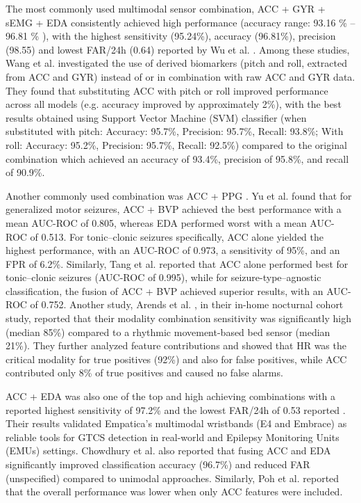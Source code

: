 The most commonly used multimodal sensor combination, ACC + GYR + sEMG + EDA \cite{Wang2025-ql,Ge2023-ab,Li2022-ty,Wu2024-yl,Wang2022-lt} consistently achieved high performance  (accuracy range: 93.16 \% \cite{Ge2023-ab} -- 96.81 \% \cite{Wu2024-yl}), with the highest sensitivity (95.24\%), accuracy (96.81\%), precision (98.55) and lowest FAR/24h (0.64) reported by Wu et al.  \cite{Wu2024-yl}. Among these studies, Wang et al. \cite{Wang2025-ql} investigated the use of derived biomarkers (pitch and roll, extracted from ACC and GYR) instead of or in combination with raw ACC and GYR data. They found that substituting ACC with pitch or roll improved performance across all models  (e.g. accuracy improved by approximately 2\%), with the best results obtained using Support Vector Machine (SVM) classifier  (when substituted with pitch: Accuracy: 95.7\%, Precision: 95.7\%, Recall: 93.8\%; With roll: Accuracy: 95.2\%, Precision: 95.7\%, Recall: 92.5\%) compared to the original combination which achieved an accuracy of 93.4\%, precision of 95.8\%, and recall of 90.9\%.

Another commonly used combination was ACC + PPG \cite{Ali2020-ke,Tang2021-td,Arends2018-ew,Yu2023-ss}. Yu et al. \cite{Yu2023-ss} found that for generalized motor seizures, ACC + BVP achieved the best performance with a mean AUC-ROC of 0.805, whereas EDA performed worst with a mean AUC-ROC of 0.513. For tonic–clonic seizures specifically, ACC alone yielded the highest performance, with an AUC-ROC of 0.973, a sensitivity of 95\%, and an FPR of 6.2\%. Similarly, Tang et al. \cite{Tang2021-td} reported that ACC alone performed best for tonic–clonic seizures (AUC-ROC of 0.995), while for seizure-type–agnostic classification, the fusion of ACC + BVP achieved superior results, with an AUC-ROC of 0.752.  Another study, Arends et al.  \cite{Arends2018-ew}, in their in-home nocturnal cohort study, reported that their modality combination sensitivity was significantly high (median 85\%) compared to a rhythmic movement-based bed sensor (median 21\%). They further analyzed feature contributions and showed that HR was the critical modality for true positives (92\%) and also for false positives, while ACC contributed only 8\% of true positives and caused no false alarms.

ACC + EDA was also one of the top and high achieving combinations \cite{Regalia2019-ch,Chowdhury2022-bi,Poh2012-af} with a reported highest sensitivity of 97.2\% \cite{Chowdhury2022-bi} and the lowest FAR/24h of 0.53 reported \cite{Regalia2019-ch}. Their results validated Empatica’s multimodal wristbands (E4 and Embrace) as reliable tools for GTCS detection in real-world and Epilepsy Monitoring Units (EMUs) settings. Chowdhury et al. \cite{Chowdhury2022-bi} also reported that fusing ACC and EDA significantly improved classification accuracy (96.7\%) and reduced FAR (unspecified) compared to unimodal approaches. Similarly, Poh et al. \cite{De_Cooman2018-pq} reported that the overall performance was lower when   only ACC features were included.

